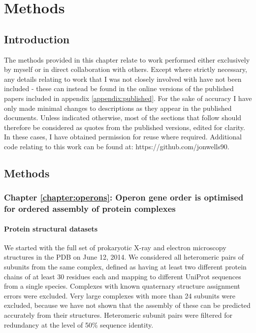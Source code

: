 \documentclass[a4paper,11pt,twoside,openright]{scrbook}
\begin{document}
\chapter{Methods}\label{chapter:methods}

\section{Introduction}
The methods provided in this chapter relate to work performed either exclusively
by myself or in direct collaboration with others. Except where strictly
necessary, any details relating to work that I was not closely involved with
have not been included - these can instead be found in the online versions of
the published papers included in appendix \ref{appendix:published}. For the sake
of accuracy I have only made minimal changes to descriptions as they appear in
the published documents. Unless indicated otherwise, most of the sections that
follow should therefore be considered as quotes from the published versions,
edited for clarity. In these cases, I have obtained permission for reuse where
required. Additional code relating to this work can be found at:
https://github.com/jonwells90.

\section{Methods}

\subsection{Chapter \ref*{chapter:operons}: Operon gene order is optimised for ordered assembly of protein complexes}

\subsubsection{Protein structural datasets}
We started with the full set of prokaryotic X-ray and electron microscopy
structures in the PDB on June 12, 2014. We considered all heteromeric pairs of
subunits from the same complex, defined as having at least two different protein
chains of at least 30 residues each and mapping to different UniProt sequences
from a single species. Complexes with known quaternary structure assignment
errors \cite{Levy2007} were excluded. Very large complexes with more than 24
subunits were excluded, because we have not shown that the assembly of these can
be predicted accurately from their structures. Heteromeric subunit pairs were
filtered for redundancy at the level of 50\% sequence identity.
\end{document}

